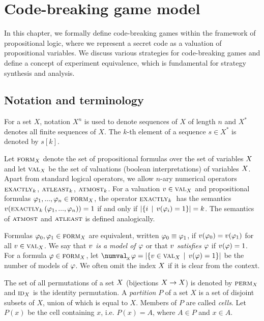 \chapter{Code-breaking game model}

In this chapter, we formally define code-breaking games
  within the framework of propositional logic,
  where we represent a secret code as a valuation
  of propositional variables.
We discuss various strategies for code-breaking games and
  define a concept of experiment equivalence,
  which is fundamental for strategy synthesis and analysis.

\section{Notation and terminology}
For a set $X$, notation $X^n$ is used to denote sequences of $X$ of length $n$
  and $X^*$ denotes all finite sequences of $X$.
The $k$-th element of a sequence $s \in X^*$ is denoted by $s[k]$.

Let $\textsc{form}_X$ denote the set of propositional formulas over
  the set of variables $X$ and let
  $\textsc{val}_X$ be the set of valuations (boolean interpretations)
  of variables $X$.
Apart from standard logical operators, we allow $n$-ary numerical operators
  $\textsc{exactly}_{k}\:\!$, $\textsc{atleast}_{k}\:\!$, $\textsc{atmost}_{k}\:\!$.
For a valuation $v\in\textsc{val}_X$ and propositional formulas
  $\varphi_1, ...,\varphi_n\in\textsc{form}_X$,
  the operator $\textsc{exactly}_{k}\:$ has the semantics
  $v(\textsc{exactly}_{k}\:(\varphi_1,...,\varphi_n)) = 1$ if and only if
  $|\{i \:\:|\:\: v(\varphi_i) = 1 \}| = k$.
The semantics of $\textsc{atmost}$ and $\textsc{atleast}$ is defined analogically.

Formulas $\varphi_0, \varphi_1 \in \textsc{form}_X$ are equivalent,
  written $\varphi_0 \equiv \varphi_1$, if
  $v(\varphi_0) = v(\varphi_1)$ for all $v\in\textsc{val}_X$.
We say that \emph{$v$ is a model of $\varphi$}
  or that \emph{$v$ satisfies $\varphi$}
  if $v(\varphi) = 1$.
For a formula $\varphi\in\textsc{form}_X$, let
  $\numval_{\!_\Var}{\form} = |\{ \val\in\Val_\Var \| \val(\form) = 1 \}|$
  be the number of models of $\varphi$.
We often omit the index $X$ if it is clear from the context.

The set of all permutations of a set $X$ (bijections $X->X$)
  is denoted by $\textsc{perm}_X$ and
  $\textsc{id}_X$ is the identity permutation.
A \emph{partition} $P$ of a set $X$ is a set of disjoint subsets of $X$,
  union of which is equal to $X$.
Members of $P$ are called \emph{cells}.
Let $P(x)$ be the cell containing $x$,
  i.e. $P(x) = A$, where $A\in P$ and $x\in A$.

